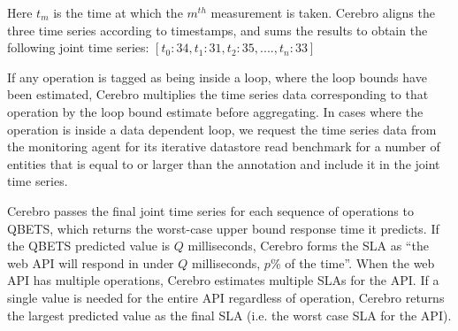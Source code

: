 Here $t_{m}$ is the time at which the $m^{th}$ measurement is taken.
Cerebro aligns the three time series according to timestamps, 
and sums the results
to obtain the following joint time series:
$[t_{0}: 34, t_{1}: 31, t_{2}: 35, ...., t_{n}: 33]$

If any operation is tagged as being inside a loop, where the loop
bounds have been estimated, Cerebro multiplies
the time series data corresponding to that 
operation by the loop bound estimate before aggregating. In cases where the operation 
is inside a data dependent loop, we request the time series data from 
the monitoring agent for its iterative datastore read benchmark 
for a number of entities that is equal to or larger than the annotation
and include it in the joint time series.

Cerebro passes the final joint
time series for each sequence of operations to QBETS, 
which returns the worst-case upper bound response time it predicts.
If the QBETS predicted value is $Q$ milliseconds, 
Cerebro forms the SLA as ``the web API will respond  in
under $Q$ milliseconds, $p$\% of the time''. 
When the web API has multiple operations, Cerebro estimates multiple 
SLAs for the API. 
If a single value is needed for the entire API regardless of operation,
Cerebro returns the largest 
predicted value as the final SLA (i.e. the worst case SLA for the API).



